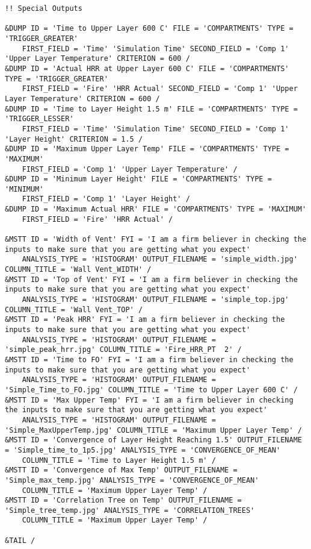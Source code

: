 \begin{lstlisting}[basicstyle=\tiny]
!! Special Outputs

&DUMP ID = 'Time to Upper Layer 600 C' FILE = 'COMPARTMENTS' TYPE = 'TRIGGER_GREATER'
    FIRST_FIELD = 'Time' 'Simulation Time' SECOND_FIELD = 'Comp 1' 'Upper Layer Temperature' CRITERION = 600 /
&DUMP ID = 'Actual HRR at Upper Layer 600 C' FILE = 'COMPARTMENTS' TYPE = 'TRIGGER_GREATER'
    FIRST_FIELD = 'Fire' 'HRR Actual' SECOND_FIELD = 'Comp 1' 'Upper Layer Temperature' CRITERION = 600 /
&DUMP ID = 'Time to Layer Height 1.5 m' FILE = 'COMPARTMENTS' TYPE = 'TRIGGER_LESSER'
    FIRST_FIELD = 'Time' 'Simulation Time' SECOND_FIELD = 'Comp 1' 'Layer Height' CRITERION = 1.5 /
&DUMP ID = 'Maximum Upper Layer Temp' FILE = 'COMPARTMENTS' TYPE = 'MAXIMUM'
    FIRST_FIELD = 'Comp 1' 'Upper Layer Temperature' /
&DUMP ID = 'Minimum Layer Height' FILE = 'COMPARTMENTS' TYPE = 'MINIMUM'
    FIRST_FIELD = 'Comp 1' 'Layer Height' /
&DUMP ID = 'Maximum Actual HRR' FILE = 'COMPARTMENTS' TYPE = 'MAXIMUM'
    FIRST_FIELD = 'Fire' 'HRR Actual' /

&MSTT ID = 'Width of Vent' FYI = 'I am a firm believer in checking the inputs to make sure that you are getting what you expect'
    ANALYSIS_TYPE = 'HISTOGRAM' OUTPUT_FILENAME = 'simple_width.jpg' COLUMN_TITLE = 'Wall Vent_WIDTH' /
&MSTT ID = 'Top of Vent' FYI = 'I am a firm believer in checking the inputs to make sure that you are getting what you expect'
    ANALYSIS_TYPE = 'HISTOGRAM' OUTPUT_FILENAME = 'simple_top.jpg' COLUMN_TITLE = 'Wall Vent_TOP' /
&MSTT ID = 'Peak HRR' FYI = 'I am a firm believer in checking the inputs to make sure that you are getting what you expect'
    ANALYSIS_TYPE = 'HISTOGRAM' OUTPUT_FILENAME = 'simple_peak_hrr.jpg' COLUMN_TITLE = 'Fire_HRR_PT  2' /
&MSTT ID = 'Time to FO' FYI = 'I am a firm believer in checking the inputs to make sure that you are getting what you expect'
    ANALYSIS_TYPE = 'HISTOGRAM' OUTPUT_FILENAME = 'Simple_Time_to_FO.jpg' COLUMN_TITLE = 'Time to Upper Layer 600 C' /
&MSTT ID = 'Max Upper Temp' FYI = 'I am a firm believer in checking the inputs to make sure that you are getting what you expect'
    ANALYSIS_TYPE = 'HISTOGRAM' OUTPUT_FILENAME = 'Simple_MaxUpperTemp.jpg' COLUMN_TITLE = 'Maximum Upper Layer Temp' /
&MSTT ID = 'Convergence of Layer Height Reaching 1.5' OUTPUT_FILENAME = 'Simple_time_to_1p5.jpg' ANALYSIS_TYPE = 'CONVERGENCE_OF_MEAN'
    COLUMN_TITLE = 'Time to Layer Height 1.5 m' /
&MSTT ID = 'Convergence of Max Temp' OUTPUT_FILENAME = 'Simple_max_temp.jpg' ANALYSIS_TYPE = 'CONVERGENCE_OF_MEAN'
    COLUMN_TITLE = 'Maximum Upper Layer Temp' /
&MSTT ID = 'Correlation Tree on Temp' OUTPUT_FILENAME = 'Simple_tree_temp.jpg' ANALYSIS_TYPE = 'CORRELATION_TREES'
    COLUMN_TITLE = 'Maximum Upper Layer Temp' /

&TAIL /
\end{lstlisting}
